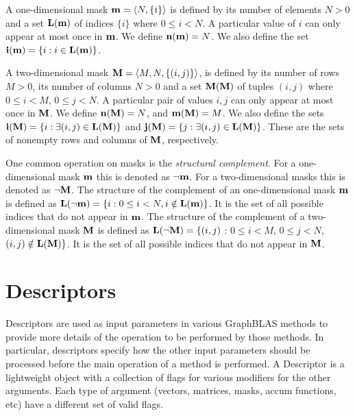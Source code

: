 A one-dimensional mask ${\bf m} = \langle N, \{ i \} \rangle$
is defined by its number of elements $N>0$ and a set $\bold{L}({\bf m})$ of indices $\{ i \}$ 
where $0 \leq i < N$.  A particular value of $i$ can only
appear at most once in ${\bf m}$. We define $\bold{n}({\bf m}) = N$. 
We also define the set
${\bf i({\bf m})} = \{ i : i \in \bold{L}({\bf m}) \}$.

A two-dimensional mask ${\bf M} = \langle M, N, \{ (i,j) \} \rangle$,
is defined by its number of rows $M>0$, its number of columns
$N>0$ and a set $\bold{M}({\bf M})$ of tuples $(i,j)$ where $0 \leq i < M$, $0 \leq
j < N$.   A particular pair of values $i,j$ can only
appear at most once in ${\bf M}$.  We define $\bold{n}({\bf M})
= N$, and $\bold{m}({\bf M}) = M$.  
We also define the sets ${\bf i({\bf M})} = \{
i : \exists (i,j) \in \bold{L}({\bf M}) \}$ and ${\bf j({\bf M})}
= \{ j : \exists (i,j) \in \bold{L}({\bf M}) \}$.  These are the sets
of nonempty rows and columns of ${\bf M}$, respectively.

One common operation on masks is the \emph{structural complement}.  For a one-dimensional mask ${\bf m}$ this
is denoted as $\neg{\bf m}$. For a two-dimensional
masks this is denoted as $\neg{\bf M}$.
The structure of the complement of an one-dimensional mask ${\bf m}$ is
defined as $\bold{L}(\neg{\bf m}) = \{i : 0 \leq i < N, i \notin \bold{L}({\bf m}) \}$.
It is the set of all possible indices that do not appear in ${\bf m}$.
The structure of the complement of a two-dimensional mask ${\bf M}$ is
defined as $\bold{L}(\neg{\bf M}) = \{(i,j)$ : $0 \leq i < M$, $0 \leq
j < N$, $(i,j) \notin \bold{L}({\bf M}) \}$.  It is the set of all possible
indices that do not appear in ${\bf M}$.

\section{Descriptors}

Descriptors are used as input parameters in various GraphBLAS methods to
provide more details of the operation to be performed by those methods.
In particular, descriptors specify how the other input parameters
should be processed before the main operation of a method is performed.
A Descriptor is a lightweight object with a collection of flags
for various modifiers for the other arguments.  Each type of argument
(vectors, matrices, masks, accum functions, etc) have a different set of
valid flags.

